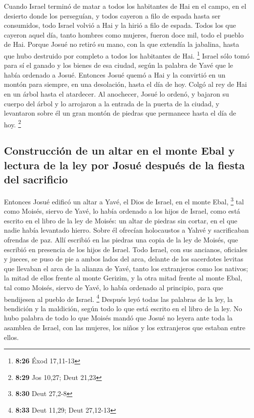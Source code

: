 \begin{paracol}{2}
 Cuando Israel terminó de matar a todos los habitantes de
Hai en el campo, en el desierto donde los perseguían, y todos cayeron a
filo de espada hasta ser consumidos, todo Israel volvió a Hai y la hirió
a filo de espada.  Todos los que cayeron aquel día, tanto
hombres como mujeres, fueron doce mil, todo el pueblo de Hai.
 Porque Josué no retiró su mano, con la que extendía la
jabalina, hasta que hubo destruido por completo a todos los habitantes
de Hai. \footnote{\textbf{8:26} Éxod 17,11-13}  Israel
sólo tomó para sí el ganado y los bienes de esa ciudad, según la palabra
de Yavé que le había ordenado a Josué.  Entonces Josué
quemó a Hai y la convirtió en un montón para siempre, en una desolación,
hasta el día de hoy.  Colgó al rey de Hai en un árbol
hasta el atardecer. Al anochecer, Josué lo ordenó, y bajaron su cuerpo
del árbol y lo arrojaron a la entrada de la puerta de la ciudad, y
levantaron sobre él un gran montón de piedras que permanece hasta el día
de hoy. \footnote{\textbf{8:29} Jos 10,27; Deut 21,23}

\hypertarget{construcciuxf3n-de-un-altar-en-el-monte-ebal-y-lectura-de-la-ley-por-josuuxe9-despuuxe9s-de-la-fiesta-del-sacrificio}{%
\subsection{Construcción de un altar en el monte Ebal y lectura de la
ley por Josué después de la fiesta del
sacrificio}\label{construcciuxf3n-de-un-altar-en-el-monte-ebal-y-lectura-de-la-ley-por-josuuxe9-despuuxe9s-de-la-fiesta-del-sacrificio}}

 Entonces Josué edificó un altar a Yavé, el Dios de
Israel, en el monte Ebal, \footnote{\textbf{8:30} Deut 27,2-8}
 tal como Moisés, siervo de Yavé, lo había ordenado a los
hijos de Israel, como está escrito en el libro de la ley de Moisés: un
altar de piedras sin cortar, en el que nadie había levantado hierro.
Sobre él ofrecían holocaustos a Yahvé y sacrificaban ofrendas de paz.
 Allí escribió en las piedras una copia de la ley de
Moisés, que escribió en presencia de los hijos de Israel.
 Todo Israel, con sus ancianos, oficiales y jueces, se
puso de pie a ambos lados del arca, delante de los sacerdotes levitas
que llevaban el arca de la alianza de Yavé, tanto los extranjeros como
los nativos; la mitad de ellos frente al monte Gerizim, y la otra mitad
frente al monte Ebal, tal como Moisés, siervo de Yavé, lo había ordenado
al principio, para que bendijesen al pueblo de Israel. \footnote{\textbf{8:33}
  Deut 11,29; Deut 27,12-13}  Después leyó todas las
palabras de la ley, la bendición y la maldición, según todo lo que está
escrito en el libro de la ley.  No hubo palabra de todo
lo que Moisés mandó que Josué no leyera ante toda la asamblea de Israel,
con las mujeres, los niños y los extranjeros que estaban entre ellos.


\end{paracol}
